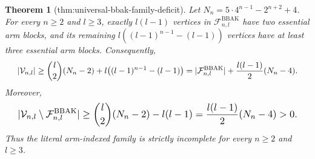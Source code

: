 \documentclass{article}
\newtheorem{theorem}{Theorem}
\begin{document}
\begin{theorem}[thm:universal-bbak-family-deficit]\label{thm:universal-bbak-family-deficit}
Let \(N_n=5\cdot4^{n-1}-2^{n+2}+4\). For every \(n\ge2\) and \(l\ge3\), exactly \(l(l-1)\) vertices in \(\mathcal F^{\mathrm{BBAK}}_{n,l}\) have two essential arm blocks, and its remaining \(l((l-1)^{n-1}-(l-1))\) vertices have at least three essential arm blocks. Consequently, \[
\makebox[\linewidth][c]{\resizebox{0.98\linewidth}{!}{\par\noindent \makebox[\linewidth][c]{\resizebox{0.98\linewidth}{!}{\(\displaystyle \displaystyle |\mathcal V_{n,l}|\ge\binom l2(N_n-2)+l\bigl((l-1)^{n-1}-(l-1)\bigr)=|\mathcal F^{\mathrm{BBAK}}_{n,l}|+\frac{l(l-1)}2(N_n-4).\)}}\par\noindent}}
\] Moreover, \[
\makebox[\linewidth][c]{\resizebox{0.98\linewidth}{!}{\par\noindent \makebox[\linewidth][c]{\resizebox{0.98\linewidth}{!}{\(\displaystyle \displaystyle |\mathcal V_{n,l}\setminus\mathcal F^{\mathrm{BBAK}}_{n,l}|\ge\binom l2(N_n-2)-l(l-1)=\frac{l(l-1)}2(N_n-4)>0.\)}}\par\noindent}}
\] Thus the literal arm-indexed family is strictly incomplete for every \(n\ge2\) and \(l\ge3\).
\end{theorem}
\end{document}
